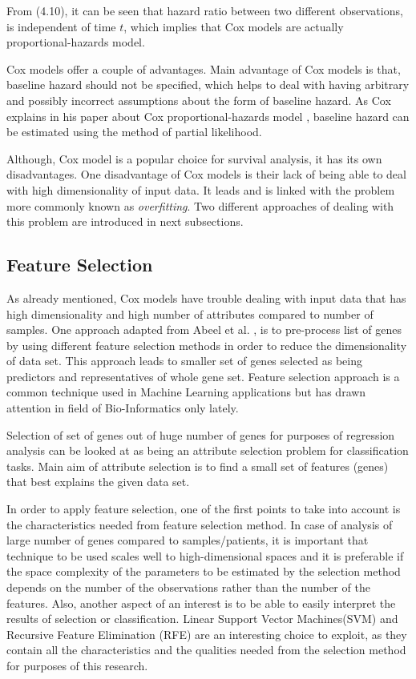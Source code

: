 \documentclass{ba-kecs}
\numberwithin{figure}{section}
\numberwithin{equation}{section}
\begin{document}
From (4.10), it can be seen that hazard ratio between two different observations, is independent of time $t$, which implies that Cox models are actually proportional-hazards model.

Cox models offer a couple of advantages. Main advantage of Cox models is that, baseline hazard should not be specified, which helps to deal with having arbitrary and possibly incorrect assumptions about the form of baseline hazard. As Cox explains in his paper about Cox proportional-hazards model \cite{coxoriginal}, baseline hazard can be estimated using the method of partial likelihood.

Although, Cox model is a popular choice for survival analysis, it has its own disadvantages. One disadvantage of Cox models is their lack of being able to deal with high dimensionality of input data. It leads and is linked with the problem more commonly known as \textit{overfitting}. Two different approaches of dealing with this problem are introduced in next subsections.

\subsection{Feature Selection}
As already mentioned, Cox models have trouble dealing with input data that has high dimensionality and high number of attributes compared to number of samples. One approach adapted from Abeel et al. \cite{bootstrapping}, is to pre-process list of genes by using different feature selection methods in order to reduce the dimensionality of data set. This approach leads to smaller set of genes selected as being predictors and representatives of whole gene set. Feature selection approach is a common technique used in Machine Learning applications but has drawn attention in field of Bio-Informatics only lately.

Selection of set of genes out of huge number of genes for purposes of regression analysis can be looked at as being an attribute selection problem for classification tasks. Main aim of attribute selection is to find a small set of features (genes) that best explains the given data set.

In order to apply feature selection, one of the first points to take into account is the characteristics needed from feature selection method. In case of analysis of large number of genes compared to samples/patients, it is important that technique to be used scales well to high-dimensional spaces and it is preferable if the space complexity of the parameters to be estimated by the selection method depends on the number of the observations rather than the number of the features. Also, another aspect of an interest is to be able to easily interpret the results of selection or classification. Linear Support Vector Machines(SVM) and Recursive Feature Elimination (RFE) are an interesting choice to exploit, as they contain all the characteristics and the qualities needed from the selection method for purposes of this research.
\end{document}

